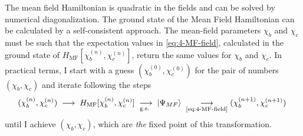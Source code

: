The mean field Hamiltonian is quadratic in the fields and can be solved by numerical diagonalization. %
The ground state of the Mean Field Hamiltonian can be calculated by a self-consistent approach. %
The mean-field parameters $\chi_b$ and $\chi_c$ must be such that the expectation values in \eqref{eq:4-MF-field}, calculated in the ground state of $H_{\text{MF}}[\chi_b^{(n)},\chi_c^{(n)}]$, return the same values for  $\chi_b$ and $\chi_c$.
In practical terms, I start with a guess $(\chi_b^{(0)},\chi_c^{(0)}) $ for the pair of numbers $(\chi_b ,\chi_c) $ and iterate following the steps
 \begin{equation}   %
(\chi_b^{(n)},\chi_c^{(n)})  \; \longrightarrow  \; H_{\text{MF}}[\chi_b^{(n)},\chi_c^{(n)}] \; \underset{\text{g.s. }}{\longrightarrow}  \; \vert \Psi_{MF} \rangle \; \underset{\text{\eqref{eq:4-MF-field}}}{\longrightarrow}  (\chi_b^{(n+1)},\chi_c^{(n+1)})  \; 
\end{equation}
until I achieve $(\chi_b ,\chi_c) $, which are \textit{the}  fixed point of this transformation.

